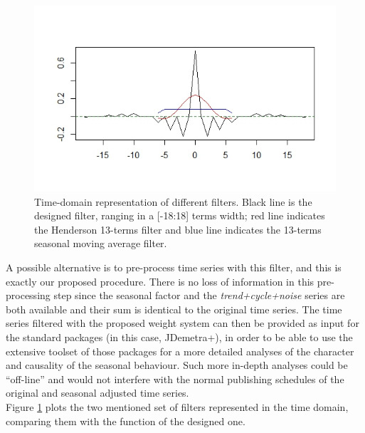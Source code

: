 \documentclass[english,blauw]{cbsdiscussionpaper}
\begin{document}
\begin{figure}[h]
\includegraphics[width=\linewidth]{../images/capitolo2/henderson_designed_ma.jpeg}
\caption{Time-domain representation of different filters. Black line is the designed filter, ranging in a [-18:18] terms width; red line indicates the Henderson 13-terms filter and blue line indicates the 13-terms seasonal moving average filter.}
\label{fig:henderson_designed_ma}
\end{figure}
A possible alternative is to pre-process time series with this filter, and this is exactly our proposed procedure. There is no loss of information in this pre-processing step since the seasonal factor and the \textit{trend+cycle+noise} series are both available and their sum is identical to the original time series. The time series filtered with the proposed weight system can then be provided as input for the standard packages (in this case, JDemetra+), in order to be able to use the extensive toolset of those packages for a more detailed analyses of the character and causality of the seasonal behaviour. Such more in-depth analyses could be ``off-line'' and would not interfere with the normal publishing schedules of the original and seasonal adjusted time series.\\
Figure \ref{fig:henderson_designed_ma} plots the two mentioned set of filters represented in the time domain, comparing them with the function of the designed one.
\end{document}
